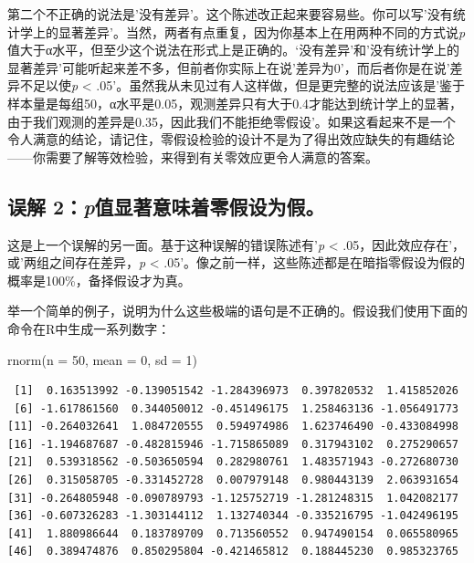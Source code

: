 \documentclass[
  letterpaper,
  DIV=11,
  numbers=noendperiod]{scrreprt}
\newenvironment{Shaded}{\begin{snugshade}}{\end{snugshade}}
\newcommand{\AttributeTok}[1]{\textcolor[rgb]{0.40,0.45,0.13}{#1}}
\newcommand{\DecValTok}[1]{\textcolor[rgb]{0.68,0.00,0.00}{#1}}
\newcommand{\FunctionTok}[1]{\textcolor[rgb]{0.28,0.35,0.67}{#1}}
\newcommand{\NormalTok}[1]{\textcolor[rgb]{0.00,0.23,0.31}{#1}}
\begin{document}
第二个不正确的说法是'没有差异'。这个陈述改正起来要容易些。你可以写'没有统计学上的显著差异'。当然，两者有点重复，因为你基本上在用两种不同的方式说\emph{p}值大于α水平，但至少这个说法在形式上是正确的。`没有差异'和'没有统计学上的显著差异'可能听起来差不多，但前者你实际上在说'差异为0'，而后者你是在说'差异不足以使\emph{p}
\textless{}
.05'。虽然我从未见过有人这样做，但是更完整的说法应该是'鉴于样本量是每组50，α水平是0.05，观测差异只有大于0.4才能达到统计学上的显著，由于我们观测的差异是0.35，因此我们不能拒绝零假设'。如果这看起来不是一个令人满意的结论，请记住，零假设检验的设计不是为了得出效应缺失的有趣结论------你需要了解等效检验，来得到有关零效应更令人满意的答案。

\hypertarget{ux8befux89e3-2pux503cux663eux8457ux610fux5473ux7740ux96f6ux5047ux8bbeux4e3aux5047}{%
\subsection{\texorpdfstring{误解
2：\emph{p}值显著意味着零假设为假。}{误解 2：p值显著意味着零假设为假。}}\label{ux8befux89e3-2pux503cux663eux8457ux610fux5473ux7740ux96f6ux5047ux8bbeux4e3aux5047}}

这是上一个误解的另一面。基于这种误解的错误陈述有'\emph{p} \textless{}
.05，因此效应存在'，或'两组之间存在差异，\emph{p} \textless{}
.05'。像之前一样，这些陈述都是在暗指零假设为假的概率是100\%，备择假设才为真。

举一个简单的例子，说明为什么这些极端的语句是不正确的。假设我们使用下面的命令在R中生成一系列数字：

\begin{Shaded}
\begin{Highlighting}[]
\FunctionTok{rnorm}\NormalTok{(}\AttributeTok{n =} \DecValTok{50}\NormalTok{, }\AttributeTok{mean =} \DecValTok{0}\NormalTok{, }\AttributeTok{sd =} \DecValTok{1}\NormalTok{)}
\end{Highlighting}
\end{Shaded}

\begin{verbatim}
 [1]  0.163513992 -0.139051542 -1.284396973  0.397820532  1.415852026
 [6] -1.617861560  0.344050012 -0.451496175  1.258463136 -1.056491773
[11] -0.264032641  1.084720555  0.594974986  1.623746490 -0.433084998
[16] -1.194687687 -0.482815946 -1.715865089  0.317943102  0.275290657
[21]  0.539318562 -0.503650594  0.282980761  1.483571943 -0.272680730
[26]  0.315058705 -0.331452728  0.007979148  0.980443139  2.063931654
[31] -0.264805948 -0.090789793 -1.125752719 -1.281248315  1.042082177
[36] -0.607326283 -1.303144112  1.132740344 -0.335216795 -1.042496195
[41]  1.880986644  0.183789709  0.713560552  0.947490154  0.065580965
[46]  0.389474876  0.850295804 -0.421465812  0.188445230  0.985323765
\end{verbatim}
\end{document}
